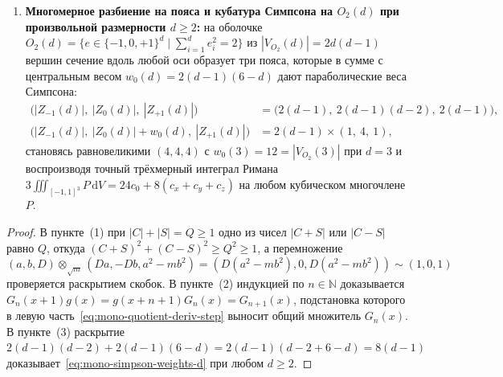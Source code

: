 \begin{theorem}
\begin{enumerate}[label=\textbf{(\arabic*)},leftmargin=*]
\begin{align}
    G_n(x) &= \prod_{j=0}^n g(x+j) \;\ge\; 1, \label{eq:mono-quotient-denom-prod} \\
    \bigl(N_n(x+1)\,G_n(x) &- N_n(x)\,G_n(x+1)\bigr)\,g(x) \;=\; N_{n+1}(x)\,G_n(x). \label{eq:mono-quotient-deriv-step}
  \end{align}
  На составной траектории $(L_1, w, L_2)$ функционал действия $\mathcal{S}(D_w) = Q_2(Q_w D_1 + P_1 D_w) + P_1 P_w D_2$ имеет первую вариацию
  \begin{equation}
    \label{eq:mono-action-variation}
    \delta\mathcal{S} \;=\; P_1\,(D_w' - D_w)\,Q_2 \qquad \bigl(\delta\mathcal{S} = 0 \iff D_w' = D_w \text{ при } P_1, Q_2 \ge 1\bigr).
  \end{equation}
\item \textbf{Многомерное разбиение на пояса и кубатура Симпсона на $O_2(d)$ при произвольной размерности $d \ge 2$:}
  на оболочке $O_2(d) = \{e \in \{-1,0,+1\}^d \mid \sum_{i=1}^d e_i^2 = 2\}$ из $|V_{O_2}(d)| = 2d(d-1)$ вершин сечение вдоль любой оси образует три пояса, которые в сумме с центральным весом $w_0(d) = 2(d-1)(6-d)$ дают параболические веса Симпсона:
  \begin{align}
    \bigl(|Z_{-1}(d)|,\ |Z_0(d)|,\ |Z_{+1}(d)|\bigr) &= \bigl(2(d-1),\ 2(d-1)(d-2),\ 2(d-1)\bigr), \label{eq:mono-belt-partition-d} \\
    \bigl(|Z_{-1}(d)|,\ |Z_0(d)| + w_0(d),\ |Z_{+1}(d)|\bigr) &= 2(d-1) \times (1,\ 4,\ 1), \label{eq:mono-simpson-weights-d}
  \end{align}
  становясь равновеликими $(4, 4, 4)$ с $w_0(3) = 12 = |V_{O_2}(3)|$ при $d = 3$ и воспроизводя точный трёхмерный интеграл Римана $3\iiint_{[-1,1]^3} P\,\mathrm{d}V = 24c_0 + 8(c_x+c_y+c_z)$ на любом кубическом многочлене $P$.
\end{enumerate}
\end{theorem}

\begin{proof}
В пункте~(1) при $|C| + |S| = Q \ge 1$ одно из чисел $|C + S|$ или $|C - S|$ равно $Q$, откуда $(C + S)^2 + (C - S)^2 \ge Q^2 \ge 1$, а перемножение $(a, b, D)\otimes_{\sqrt{m}}(Da, -Db, a^2 - m b^2) = (D(a^2 - m b^2), 0, D(a^2 - m b^2)) \sim (1, 0, 1)$ проверяется раскрытием скобок. В пункте~(2) индукцией по $n \in \mathbb{N}$ доказывается $G_n(x+1)g(x) = g(x+n+1)G_n(x) = G_{n+1}(x)$, подстановка которого в левую часть~\eqref{eq:mono-quotient-deriv-step} выносит общий множитель $G_n(x)$. В пункте~(3) раскрытие $2(d-1)(d-2) + 2(d-1)(6-d) = 2(d-1)(d - 2 + 6 - d) = 8(d-1)$ доказывает~\eqref{eq:mono-simpson-weights-d} при любом $d \ge 2$.
\end{proof}

